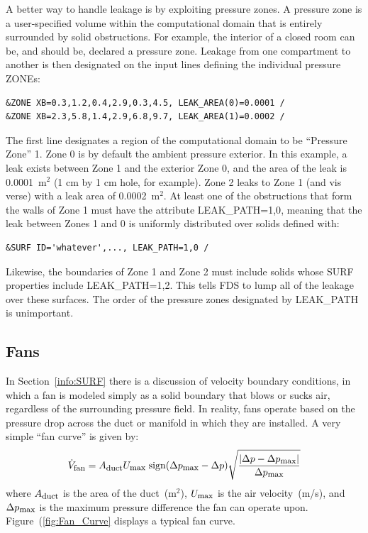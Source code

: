 \documentclass[11pt]{book}
\newcommand{\be}{\begin{equation}}
\newcommand{\ee}{\end{equation}}
\begin{document}
A better way to handle leakage is by exploiting pressure zones. A pressure zone is a user-specified volume within the computational domain that is
entirely surrounded by solid obstructions. For example, the interior of a closed room can be, and should be, declared a pressure zone. Leakage from one
compartment to another is then designated on the input lines defining the individual pressure {\ct ZONE}s:

\footnotesize
\begin{verbatim}
&ZONE XB=0.3,1.2,0.4,2.9,0.3,4.5, LEAK_AREA(0)=0.0001 /
&ZONE XB=2.3,5.8,1.4,2.9,6.8,9.7, LEAK_AREA(1)=0.0002 /
\end{verbatim}
\normalsize

\noindent
The first line designates a region of the computational domain to be ``Pressure Zone'' 1.
Zone 0 is by default the ambient pressure exterior.
In this example, a leak exists between Zone 1 and the exterior Zone 0, and the area of the leak
is 0.0001~m$^2$ (1 cm by 1 cm hole, for example). Zone 2 leaks to Zone 1 (and vis verse)
with a leak area of 0.0002~m$^2$.
At least one of the obstructions that form the walls of Zone 1 must have the attribute
{\ct LEAK\_PATH=1,0}, meaning that the leak between Zones 1 and 0 is uniformly distributed
over solids defined with:

\footnotesize
\begin{verbatim}
&SURF ID='whatever',..., LEAK_PATH=1,0 /
\end{verbatim}
\normalsize

\noindent
Likewise, the boundaries of Zone 1 and Zone 2 must include solids whose {\ct SURF} properties include {\ct LEAK\_PATH=1,2}. This tells FDS to lump all of the
leakage over these surfaces. The order of the pressure zones designated by {\ct LEAK\_PATH} is unimportant.




\subsection{Fans}
\label{info:Fans}

In Section~\ref{info:SURF} there is a discussion of velocity boundary conditions, in which a fan is modeled simply as a solid boundary that blows or
sucks air, regardless of the surrounding pressure field. In reality, fans operate based on the pressure drop across the duct or manifold in which they are
installed. A very simple ``fan curve'' is given by:
\be \dot{V}_{\hbox{\footnotesize fan}} = A_{\hbox{\footnotesize duct}} U_{\hbox{\footnotesize max}} \;
   \hbox{sign} (\Delta p_{\hbox{\footnotesize max}}-\Delta p)
   \sqrt{ \frac{ |\Delta p - \Delta p_{\hbox{\footnotesize max}}|}{\Delta p_{\hbox{\footnotesize max}} } }  \ee
where $A_{\hbox{\footnotesize duct}}$ is the area of the duct~(m$^2$), $U_{\hbox{\footnotesize max}}$ is the air velocity~(m/s), and $\Delta p_{\hbox{\footnotesize max}}$ is the maximum
pressure difference the fan can operate upon. Figure~(\ref{fig:Fan_Curve} displays a typical fan curve.
\end{document}
